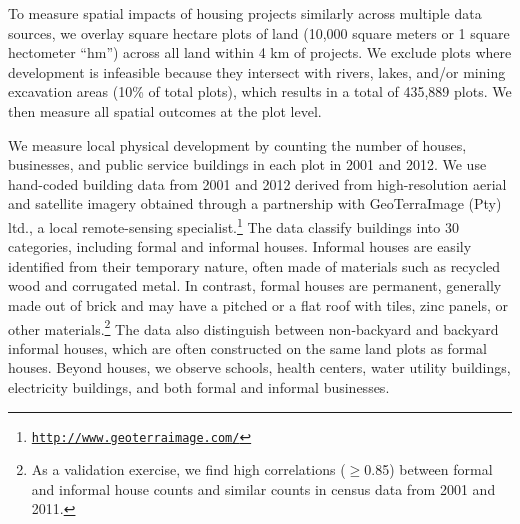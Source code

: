 \documentclass[12pt]{article}
\begin{document}


To measure spatial impacts of housing projects similarly across multiple data sources, we overlay square hectare plots of land (10,000 square meters or 1 square hectometer ``hm'') across all land within 4 km of projects.  We exclude plots where development is infeasible because they intersect with rivers, lakes, and/or mining excavation areas (10\% of total plots), which results in a total of 435,889 plots.  We then measure all spatial outcomes at the plot level. 

We measure local physical development by counting the number of houses, businesses, and public service buildings in each plot in 2001 and 2012.  We use hand-coded building data from 2001 and 2012 derived from high-resolution aerial and satellite imagery obtained through a partnership with GeoTerraImage (Pty) ltd., a local remote-sensing specialist.\footnote{\href{http://www.geoterraimage.com/}{\tt http://www.geoterraimage.com/}} The data classify buildings into 30 categories, including formal and informal houses. Informal houses are easily identified from their temporary nature, often made of materials such as recycled wood and corrugated metal. In contrast, formal houses are permanent, generally made out of brick and may have a pitched or a flat roof with tiles, zinc panels, or other materials.\footnote{As a validation exercise, we find high correlations ($\geq$0.85) between formal and informal house counts and similar counts in census data from 2001 and 2011.}  The data also distinguish between non-backyard and backyard informal houses, which are often constructed on the same land plots as formal houses.  Beyond houses, we observe schools, health centers, water utility buildings, electricity buildings, and both formal and informal businesses.  


\end{document}
